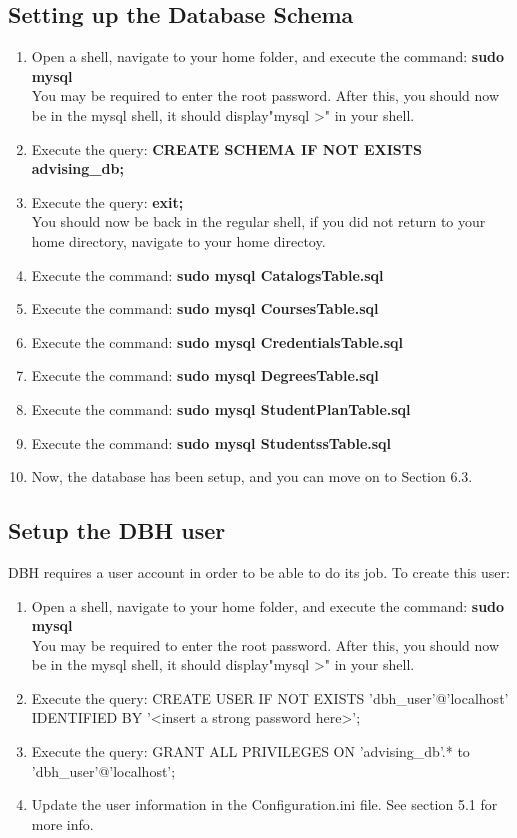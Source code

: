 \documentclass[letterpaper]{article}
\begin{document}
	\subsection{Setting up the Database Schema}
	\begin{enumerate}
		\item Open a shell, navigate to your home folder, and execute the command: \textbf{sudo mysql} \\You may be required to enter the root password. After this, you should now be in the mysql shell, it should display"mysql >" in your shell.
		\item Execute the query: \textbf{CREATE SCHEMA IF NOT EXISTS advising\_db;}
		\item Execute the query: \textbf{exit;} \\You should now be back in the regular shell, if you did not return to your home directory, navigate to your home directoy.
		\item Execute the command: \textbf{sudo mysql CatalogsTable.sql}
		\item Execute the command: \textbf{sudo mysql CoursesTable.sql}
		\item Execute the command: \textbf{sudo mysql CredentialsTable.sql}
		\item Execute the command: \textbf{sudo mysql DegreesTable.sql}
		\item Execute the command: \textbf{sudo mysql StudentPlanTable.sql}
		\item Execute the command: \textbf{sudo mysql StudentssTable.sql}
		\item Now, the database has been setup, and you can move on to Section 6.3.
	\end{enumerate}

	\subsection{Setup the DBH user}
	DBH requires a user account in order to be able to do its job. To create this user:
	\begin{enumerate}
		\item Open a shell, navigate to your home folder, and execute the command: \textbf{sudo mysql} \\You may be required to enter the root password. After this, you should now be in the mysql shell, it should display"mysql >" in your shell.
		\item Execute the query: CREATE USER IF NOT EXISTS 'dbh\_user'@'localhost' IDENTIFIED BY '<insert a strong password here>';
		\item Execute the query: GRANT ALL PRIVILEGES ON  'advising\_db'.* to 'dbh\_user'@'localhost';
		\item Update the user information in the Configuration.ini file. See section 5.1 for more info.
	\end{enumerate}
\end{document}
